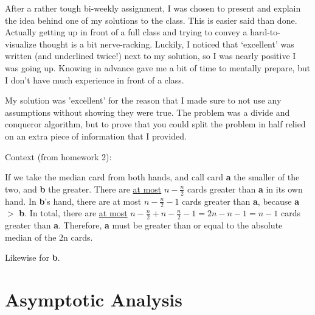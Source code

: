 \documentclass[a4paper,12pt]{article}
\newenvironment{indentpar}[1]%
{\begin{list}{}%
    {\setlength{\leftmargin}{#1}}%
  \item[]%
  }
  {\end{list}}
\begin{document}
\begin{enumerate}[]

\item After a rather tough bi-weekly assignment, I was chosen to
  present and explain the idea behind one of my solutions to the
  class. This is easier said than done.  Actually getting up in front
  of a full class and trying to convey a hard-to-visualize thought is
  a bit nerve-racking. Luckily, I noticed that `excellent' was written
  (and underlined twice!) next to my solution, so I was nearly
  positive I was going up. Knowing in advance gave me a bit of time to
  mentally prepare, but I don't have much experience in front of a
  class.

\item My solution was 'excellent' for the reason that I made sure to
  not use any assumptions without showing they were true. The problem
  was a divide and conqueror algorithm, but to prove that you could
  split the problem in half relied on an extra piece of information
  that I provided.

\item Context (from homework 2):
  \begin{indentpar}{0.5in}
    
    If we take the median card from both hands, and call
    card {\bf a} the smaller of the two, and {\bf b} the
    greater. There are \underline{at most} \(n - \frac{n}{2}\) cards
    greater than {\bf a} in its own hand. In {\bf b}'s hand, there are
    at most \(n - \frac{n}{2} - 1\) cards greater than {\bf a},
    because {\bf a} \(>\) {\bf b}. In total, there are \underline{at
      most} \( n - \frac{n}{2} + n - \frac{n}{2} - 1 = 2n - n - 1 = n
    - 1\) cards greater than {\bf a}. Therefore, {\bf a} must be
    greater than or equal to the absolute median of the 2n cards.

    Likewise for {\bf b}.

  \end{indentpar}

\end{enumerate}

\section*{Asymptotic Analysis}
\end{document}
